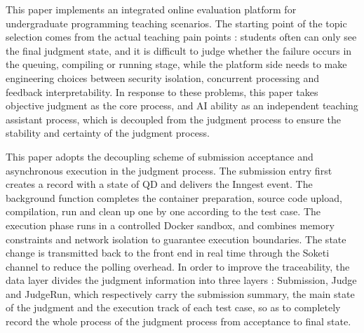 \begin{abstractEn}

This paper implements an integrated online evaluation platform for undergraduate programming teaching scenarios. The starting point of the topic selection comes from the actual teaching pain points : students often can only see the final judgment state, and it is difficult to judge whether the failure occurs in the queuing, compiling or running stage, while the platform side needs to make engineering choices between security isolation, concurrent processing and feedback interpretability. In response to these problems, this paper takes objective judgment as the core process, and AI ability as an independent teaching assistant process, which is decoupled from the judgment process to ensure the stability and certainty of the judgment process.

This paper adopts the decoupling scheme of submission acceptance and asynchronous execution in the judgment process. The submission entry first creates a record with a state of QD and delivers the Inngest event. The background function completes the container preparation, source code upload, compilation, run and clean up one by one according to the test case. The  execution phase runs in a controlled Docker sandbox, and combines memory constraints and network isolation to guarantee execution boundaries. The state change is transmitted back to the front end in real time through the Soketi channel to reduce the polling overhead. In order to improve the traceability, the data layer divides the judgment information into three layers : Submission, Judge and JudgeRun, which respectively carry the submission summary, the main state of the judgment and the execution track of each test case, so as to completely record the whole process of the judgment process from acceptance to final state.


\end{abstractEn}
